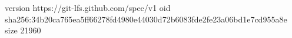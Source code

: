 version https://git-lfs.github.com/spec/v1
oid sha256:34b20ca765ea5ff66278fd4980e44030d72b6083fde2fe23a06bd1e7cd955a8e
size 21960
